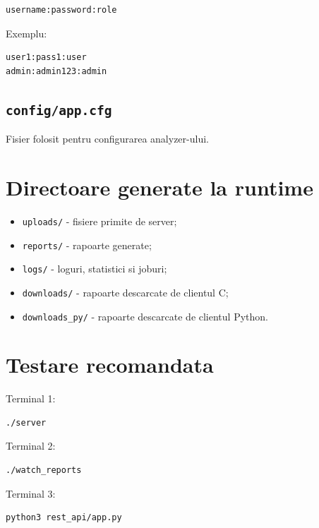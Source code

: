 \documentclass[12pt,a4paper]{article}
\begin{document}
\begin{lstlisting}[style=code]
username:password:role
\end{lstlisting}

Exemplu:

\begin{lstlisting}[style=code]
user1:pass1:user
admin:admin123:admin
\end{lstlisting}

\subsection{\texttt{config/app.cfg}}

Fisier folosit pentru configurarea analyzer-ului.

\section{Directoare generate la runtime}

\begin{itemize}
    \item \texttt{uploads/} - fisiere primite de server;
    \item \texttt{reports/} - rapoarte generate;
    \item \texttt{logs/} - loguri, statistici si joburi;
    \item \texttt{downloads/} - rapoarte descarcate de clientul C;
    \item \texttt{downloads\_py/} - rapoarte descarcate de clientul Python.
\end{itemize}

\section{Testare recomandata}

Terminal 1:

\begin{lstlisting}[style=code]
./server
\end{lstlisting}

Terminal 2:

\begin{lstlisting}[style=code]
./watch_reports
\end{lstlisting}

Terminal 3:

\begin{lstlisting}[style=code]
python3 rest_api/app.py
\end{lstlisting}
\end{document}
